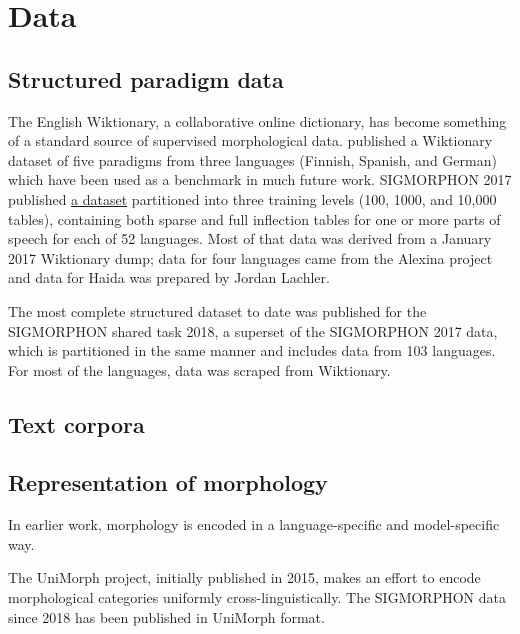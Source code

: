 \chapter{Data}

\section{Structured paradigm data}

The English Wiktionary, a collaborative online dictionary, has become something of a standard source of supervised morphological data. \cite{Durrett2013} published a Wiktionary dataset of five paradigms from three languages (Finnish, Spanish, and German) which have been used as a benchmark in much future work. \parencite{Hulden2014} \parencite{Nicolai2015} \parencite{Ahlberg2015} \parencite{Faruqui2015} SIGMORPHON 2017 published \href{https://github.com/sigmorphon/conll2017/tree/master/all}{a dataset} partitioned into three training levels (100, 1000, and 10,000 tables), containing both sparse and full inflection tables for one or more parts of speech for each of 52 languages. Most of that data was derived from a January 2017 Wiktionary dump; data for four languages came from the Alexina project and data for Haida was prepared by Jordan Lachler. \parencite{Cotterell2017} 

The most complete structured dataset to date was published for the SIGMORPHON shared task 2018, a superset of the SIGMORPHON 2017 data, which is partitioned in the same manner and includes data from 103 languages. For most of the languages, data was scraped from Wiktionary.

\section{Text corpora}

\section{Representation of morphology}

In earlier work, morphology is encoded in a language-specific and model-specific way.

\parencite{Luong2013} The UniMorph project, initially published in 2015, makes an effort to encode morphological categories uniformly cross-linguistically. \parencite{SylakGlassman2015} \parencite{SylakGlassman2015a} \parencite{SylakGlassman2016} The SIGMORPHON data since 2018 has been published in UniMorph format.